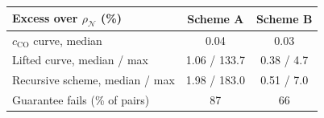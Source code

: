 \begin{tabular}{lcc}
\toprule
Excess over $\rho_\mathcal{N}$ (\%) & Scheme A & Scheme B\\
\midrule
$c_{\mathrm{CO}}$ curve, median & 0.04 & 0.03\\
Lifted curve, median / max & 1.06 / 133.7 & 0.38 / 4.7\\
Recursive scheme, median / max & 1.98 / 183.0 & 0.51 / 7.0\\
Guarantee fails (\% of pairs) & 87 & 66\\
\bottomrule
\end{tabular}
